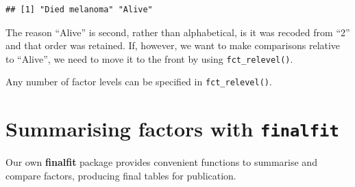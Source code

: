 \documentclass[
  12pt,
  krantz2]{krantz}
\makeatletter
\newenvironment{Shaded}{\begin{snugshade}}{\end{snugshade}}
\newcommand{\DataTypeTok}[1]{\textcolor[rgb]{0.13,0.29,0.53}{#1}}
\newcommand{\KeywordTok}[1]{\textcolor[rgb]{0.13,0.29,0.53}{\textbf{#1}}}
\newcommand{\NormalTok}[1]{#1}
\newcommand{\OperatorTok}[1]{\textcolor[rgb]{0.81,0.36,0.00}{\textbf{#1}}}
\newcommand{\StringTok}[1]{\textcolor[rgb]{0.31,0.60,0.02}{#1}}
\newenvironment{kframe}{%
\medskip{}
\setlength{\fboxsep}{.8em}
 \def\at@end@of@kframe{}%
 \ifinner\ifhmode%
  \def\at@end@of@kframe{\end{minipage}}%
  \begin{minipage}{\columnwidth}%
 \fi\fi%
 \def\FrameCommand##1{\hskip\@totalleftmargin \hskip-\fboxsep
 \colorbox{shadecolor}{##1}\hskip-\fboxsep
     \hskip-\linewidth \hskip-\@totalleftmargin \hskip\columnwidth}%
 \MakeFramed {\advance\hsize-\width
   \@totalleftmargin\z@ \linewidth\hsize
   \@setminipage}}%
 {\par\unskip\endMakeFramed%
 \at@end@of@kframe}
\renewenvironment{Shaded}{\begin{kframe}}{\end{kframe}}
\makeatother
\begin{document}
\begin{verbatim}
## [1] "Died melanoma" "Alive"
\end{verbatim}

The reason ``Alive'' is second, rather than alphabetical, is it was recoded from ``2'' and that order was retained.
If, however, we want to make comparisons relative to ``Alive'', we need to move it to the front by using \texttt{fct\_relevel()}.

\begin{Shaded}
\end{Shaded}

Any number of factor levels can be specified in \texttt{fct\_relevel()}.

\hypertarget{summarising-factors-with-finalfit}{%
\section{\texorpdfstring{Summarising factors with \texttt{finalfit}}{Summarising factors with finalfit}}\label{summarising-factors-with-finalfit}}


Our own \textbf{finalfit} package provides convenient functions to summarise and compare factors, producing final tables for publication.

\begin{Shaded}
\end{Shaded}

\begin{table}[!h]

\caption{\label{tab:chap08-tab-2x2}Two-by-two table with finalfit: Died with melanoma by tumour ulceration status.}
\centering
{}
\end{table}
\end{document}
